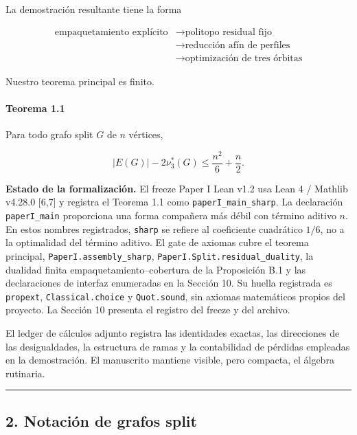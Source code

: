 \documentclass[
  spanish,
  11pt,
  a4paper,
]{article}
\begin{document}
La demostración resultante tiene la forma

\[
\begin{aligned}
\text{empaquetamiento explícito}
&\longrightarrow
\text{politopo residual fijo}\\
&\longrightarrow
\text{reducción afín de perfiles}\\
&\longrightarrow
\text{optimización de tres órbitas}
\end{aligned}
\]

Nuestro teorema principal es finito.

\paragraph{Teorema 1.1}\label{teorema-1.1}

Para todo grafo split \(G\) de \(n\) vértices,

\[
|E(G)|-2\nu_3^*(G)
\le
\frac{n^2}{6}+\frac{n}{2}.
\]

\textbf{Estado de la formalización.} El freeze Paper I Lean v1.2 usa Lean 4 / Mathlib v4.28.0 {[}6,7{]} y registra el Teorema 1.1 como \texttt{paperI\_main\_sharp}. La declaración \texttt{paperI\_main} proporciona una forma compañera más débil con término aditivo \(n\). En estos nombres registrados, \texttt{sharp} se refiere al coeficiente cuadrático \(1/6\), no a la optimalidad del término aditivo. El gate de axiomas cubre el teorema principal, \texttt{PaperI.assembly\_sharp}, \texttt{PaperI.Split.residual\_duality}, la dualidad finita empaquetamiento--cobertura de la Proposición B.1 y las declaraciones de interfaz enumeradas en la Sección 10. Su huella registrada es \texttt{propext}, \texttt{Classical.choice} y \texttt{Quot.sound}, sin axiomas matemáticos propios del proyecto. La Sección 10 presenta el registro del freeze y del archivo.

El ledger de cálculos adjunto registra las identidades exactas, las direcciones de las desigualdades, la estructura de ramas y la contabilidad de pérdidas empleadas en la demostración. El manuscrito mantiene visible, pero compacta, el álgebra rutinaria.

\begin{center}\rule{0.5\linewidth}{0.5pt}\end{center}

\subsection{2. Notación de grafos split}\label{notaciuxf3n-de-grafos-split}
\end{document}
